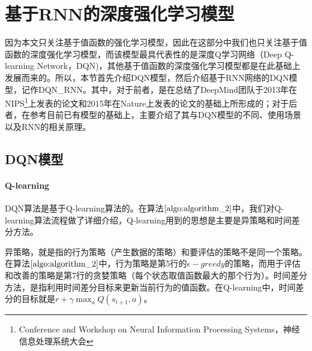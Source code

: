 \section{基于RNN的深度强化学习模型}
因为本文只关注基于值函数的强化学习模型，因此在这部分中我们也只关注基于值函数的深度强化学习模型，而该模型最具代表性的是深度Q学习网络（Deep Q-learning Network，DQN)，其他基于值函数的深度强化学习模型都是在此基础上发展而来的。所以，本节首先介绍DQN模型，然后介绍基于RNN网络的DQN模型，记作DQN\_RNN。其中，对于前者，是在总结了DeepMind团队于2013年在NIPS\footnote{Conference and Workshop on Neural Information Processing Systems，神经信息处理系统大会}上发表的论文\citep{mnih2013playing}和2015年在Nature上发表的论文\citep{mnih2015human}的基础上所形成的；对于后者，在参考目前已有模型\citep{hausknecht2015deep,narasimhan2015language}的基础上，主要介绍了其与DQN模型的不同、使用场景以及RNN的相关原理。



\subsection{DQN模型}

 \paragraph{Q-learning}
 DQN算法是基于Q-learning算法的。在算法$\ref{algo:algorithm_2}$中，我们对Q-learning算法流程做了详细介绍，Q-learning用到的思想是主要是异策略和时间差分方法。

异策略，就是指的行为策略（产生数据的策略）和要评估的策略不是同一个策略。在算法$\ref{algo:algorithm_2}$中，行为策略是第5行的$\epsilon-greedy$的策略，而用于评估和改善的策略是第7行的贪婪策略（每个状态取值函数最大的那个行为）。时间差分方法，是指利用时间差分目标来更新当前行为的值函数。在Q-learning中，时间差分的目标就是$r+\gamma \max_{a} Q(s_{t+1},a)$。

